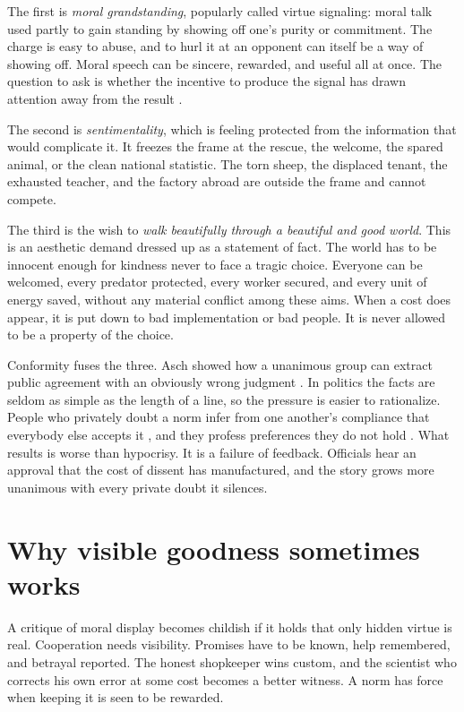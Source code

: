 \documentclass[12pt,a4paper]{book}
\begin{document}
The first is \emph{moral grandstanding}, popularly called virtue signaling: moral talk used partly to gain standing by showing off one's purity or commitment. The charge is easy to abuse, and to hurl it at an opponent can itself be a way of showing off. Moral speech can be sincere, rewarded, and useful all at once. The question to ask is whether the incentive to produce the signal has drawn attention away from the result \cite{TosiWarmke2020}.

The second is \emph{sentimentality}, which is feeling protected from the information that would complicate it. It freezes the frame at the rescue, the welcome, the spared animal, or the clean national statistic. The torn sheep, the displaced tenant, the exhausted teacher, and the factory abroad are outside the frame and cannot compete.

The third is the wish to \emph{walk beautifully through a beautiful and good world}. This is an aesthetic demand dressed up as a statement of fact. The world has to be innocent enough for kindness never to face a tragic choice. Everyone can be welcomed, every predator protected, every worker secured, and every unit of energy saved, without any material conflict among these aims. When a cost does appear, it is put down to bad implementation or bad people. It is never allowed to be a property of the choice.

Conformity fuses the three. Asch showed how a unanimous group can extract public agreement with an obviously wrong judgment \cite{Asch1956}. In politics the facts are seldom as simple as the length of a line, so the pressure is easier to rationalize. People who privately doubt a norm infer from one another's compliance that everybody else accepts it \cite{PrenticeMiller1993}, and they profess preferences they do not hold \cite{Kuran1995}. What results is worse than hypocrisy. It is a failure of feedback. Officials hear an approval that the cost of dissent has manufactured, and the story grows more unanimous with every private doubt it silences.

\section{Why visible goodness sometimes works}

A critique of moral display becomes childish if it holds that only hidden virtue is real. Cooperation needs visibility. Promises have to be known, help remembered, and betrayal reported. The honest shopkeeper wins custom, and the scientist who corrects his own error at some cost becomes a better witness. A norm has force when keeping it is seen to be rewarded.
\end{document}

